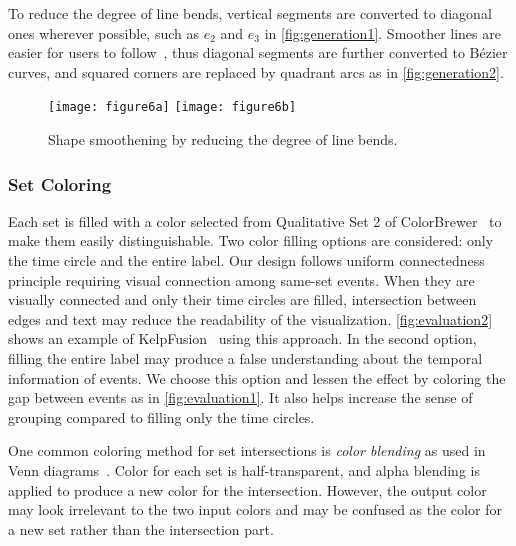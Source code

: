 To reduce the degree of line bends, vertical segments are converted to diagonal ones wherever possible, such as  $e_2$ and $e_3$ in \autoref{fig:generation1}. Smoother lines are easier for users to follow~\cite{Kim2010}, thus diagonal segments are further converted to B\'{e}zier curves, and squared corners are replaced by quadrant arcs as in \autoref{fig:generation2}.

\begin{figure}[!htb]
	\centering
		{\texttt{[image: figure6a]}}
	\hfill
		{\texttt{[image: figure6b]}}
	\caption{Shape smoothening by reducing the degree of line bends.}
	\label{fig:generation}
\end{figure}

\subsubsection{Set Coloring}
\label{sub:ts-eventmembership}
Each set is filled with a color selected from Qualitative Set 2 of ColorBrewer~\cite{Harrower2003} to make them easily distinguishable. Two color filling options are considered: only the time circle and the entire label. Our design follows uniform connectedness principle requiring visual connection among same-set events. When they are visually connected and only their time circles are filled, intersection between edges and text may reduce the readability of the visualization. \autoref{fig:evaluation2} shows an example of KelpFusion~\cite{Meulemans2013} using this approach. In the second option, filling the entire label may produce a false understanding about the temporal information of events. We choose this option and lessen the effect by coloring the gap between events as in \autoref{fig:evaluation1}. It also helps increase the sense of grouping compared to filling only the time circles.

One common coloring method for set intersections is \emph{color blending} as used in Venn diagrams~\cite{Ware2013}. Color for each set is half-transparent, and alpha blending is applied to produce a new color for the intersection. However, the output color may look irrelevant to the two input colors and may be confused as the color for a new set rather than the intersection part.

